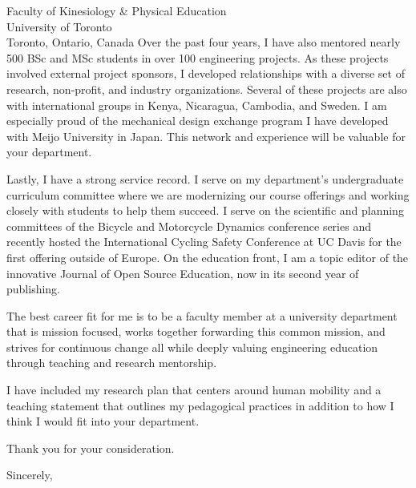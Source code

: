 \documentclass{letter}
\begin{document}
\begin{letter}{
  Faculty of Kinesiology \& Physical Education \\
  University of Toronto \\
  Toronto, Ontario, Canada
}
Over the past four years, I have also mentored nearly 500 BSc and MSc students
in over 100 engineering projects. As these projects involved external project
sponsors, I developed relationships with a diverse set of research, non-profit,
and industry organizations. Several of these projects are also with
international groups in Kenya, Nicaragua, Cambodia, and Sweden. I am especially
proud of the mechanical design exchange program I have developed with Meijo
University in Japan. This network and experience will be valuable for your
department.

Lastly, I have a strong service record. I serve on my department's
undergraduate curriculum committee where we are modernizing our course
offerings and working closely with students to help them succeed. I serve on
the scientific and planning committees of the Bicycle and Motorcycle Dynamics
conference series and recently hosted the International Cycling Safety
Conference at UC Davis for the first offering outside of Europe. On the
education front, I am a topic editor of the innovative Journal of Open Source
Education, now in its second year of publishing.

The best career fit for me is to be a faculty member at a university department
that is mission focused, works together forwarding this common mission, and
strives for continuous change all while deeply valuing engineering education
through teaching and research mentorship.

I have included my research plan that centers around human mobility and a
teaching statement that outlines my pedagogical practices in addition to how I
think I would fit into your department.

Thank you for your consideration.

\closing{Sincerely,}

\end{letter}
\end{document}
